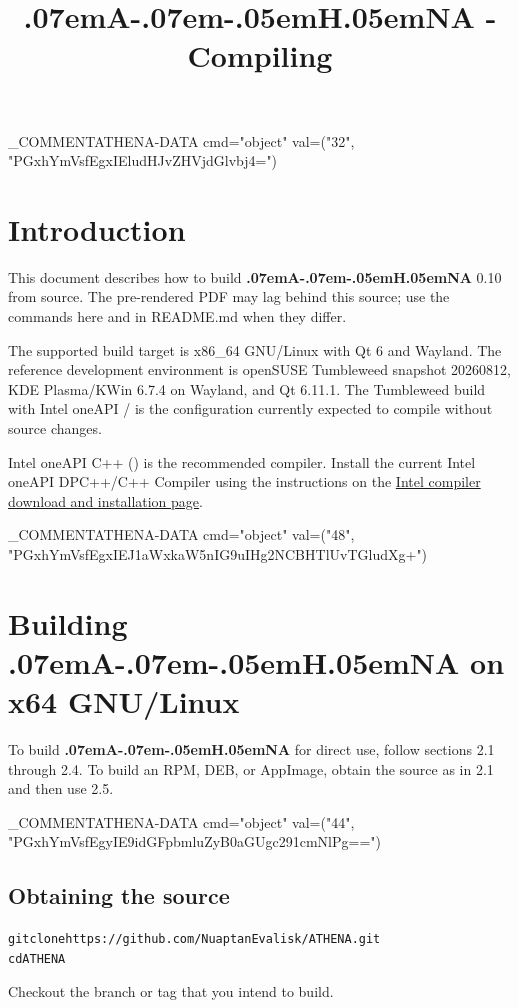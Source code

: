 \documentclass{article}
\newcommand{\ATHENA}{\textbf{\kern.07emA\kern-.07em\raisebox{.25ex}{\scalebox{.7}{T}}\kern-.05emH\kern.05em\raisebox{-.25ex}{\scalebox{.7}{E}}NA}}
\newcommand{\tmverbatim}[1]{\text{{\ttfamily{#1}}}}
\newenvironment{tmcode}[1][]{\begin{alltt} }{\end{alltt}}
{\theorembodyfont{\rmfamily}\newtheorem{remark}{Remark}}
\begin{document}
\title{{\ATHENA} - Compiling}

\date{}

\maketitle

\INLINE_COMMENT{ATHENA-DATA cmd="object" val=("32", "PGxhYmVsfEgxIEludHJvZHVjdGlvbj4=")}

\section{Introduction}

This document describes how to build {\ATHENA} 0.10 from source. The
pre-rendered PDF may lag behind this source; use the commands here and in
README.md when they differ.

The supported build target is x86\_64 GNU/Linux with Qt 6 and Wayland. The
reference development environment is openSUSE Tumbleweed snapshot 20260812,
KDE Plasma/KWin 6.7.4 on Wayland, and Qt 6.11.1. The Tumbleweed build with
Intel oneAPI \tmverbatim{icx}/\tmverbatim{icpx} is the configuration currently
expected to compile without source changes.

Intel oneAPI C++ (\tmverbatim{icpx}) is the recommended compiler. Install the
current Intel oneAPI DPC++/C++ Compiler using the instructions on the
\href{https://www.intel.com/content/www/us/en/developer/tools/oneapi/dpc-compiler-download.html}{Intel
compiler download and installation page}.

\INLINE_COMMENT{ATHENA-DATA cmd="object" val=("48", "PGxhYmVsfEgxIEJ1aWxkaW5nIG9uIHg2NCBHTlUvTGludXg+")}

\section{Building {\ATHENA} on x64 GNU/Linux}

To build {\ATHENA} for direct use, follow sections 2.1 through 2.4. To build
an RPM, DEB, or AppImage, obtain the source as in 2.1 and then use 2.5.

\INLINE_COMMENT{ATHENA-DATA cmd="object" val=("44", "PGxhYmVsfEgyIE9idGFpbmluZyB0aGUgc291cmNlPg==")}

\subsection{Obtaining the source}

\begin{tmcode}
git clone https://github.com/NuaptanEvalisk/ATHENA.git
cd ATHENA
\end{tmcode}
Checkout the branch or tag that you intend to build.
\end{document}
